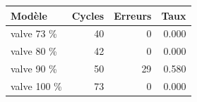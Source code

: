 \begin{tabular}{lrrr}
\toprule
Modèle & Cycles & Erreurs & Taux \\
\midrule
valve 73 \% & 40 & 0 & 0.000 \\
valve 80 \% & 42 & 0 & 0.000 \\
valve 90 \% & 50 & 29 & 0.580 \\
valve 100 \% & 73 & 0 & 0.000 \\
\bottomrule
\end{tabular}